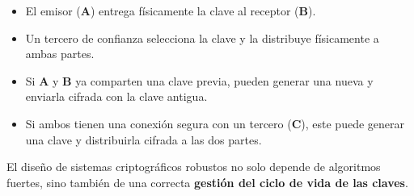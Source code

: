 \documentclass[11pt,a4paper]{article}
\begin{document}
\begin{itemize}
    \item El emisor (\textbf{A}) entrega físicamente la clave al receptor (\textbf{B}).
    \item Un tercero de confianza selecciona la clave y la distribuye físicamente a ambas partes.
    \item Si \textbf{A} y \textbf{B} ya comparten una clave previa, pueden generar una nueva y enviarla cifrada con la clave antigua.
    \item Si ambos tienen una conexión segura con un tercero (\textbf{C}), este puede generar una clave y distribuirla cifrada a las dos partes.
\end{itemize}

\begin{RecordatorioBox}
El diseño de sistemas criptográficos robustos no solo depende de algoritmos fuertes, sino también de una correcta \textbf{gestión del ciclo de vida de las claves}.
\end{RecordatorioBox}
\end{document}
